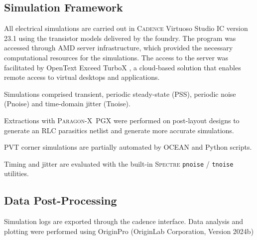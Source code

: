 \subsection{Simulation Framework}
All electrical simulations are carried out in \textsc{Cadence} Virtuoso Studio IC version 23.1 \cite{CadenceVirtuosoIC231ISR13} using the transistor models delivered by the foundry. The program was accessed through AMD server infrastructure, which provided the necessary computational resources for the simulations. The access to the server was facilitated by OpenText Exceed TurboX \cite{RedHatExceedTurboX}, a cloud-based solution that enables remote access to virtual desktops and applications.

Simulations comprised transient, periodic steady-state (PSS), periodic noise (Pnoise) and time-domain jitter (Tnoise).

Extractions with \textsc{Paragon-X}~PGX \cite{AnsysParagonX2025} were performed on post-layout designs to generate an RLC parasitics netlist and generate more accurate simulations.

PVT corner simulations are partially automated by \textsc{OCEAN} and Python scripts.

Timing and jitter are evaluated with the built-in \textsc{Spectre} \texttt{pnoise} / \texttt{tnoise} utilities. 


\subsection{Data Post-Processing}
Simulation logs are exported through the cadence interface. Data analysis and plotting were performed using OriginPro (OriginLab Corporation, Version 2024b) \cite{OriginLab2025}
